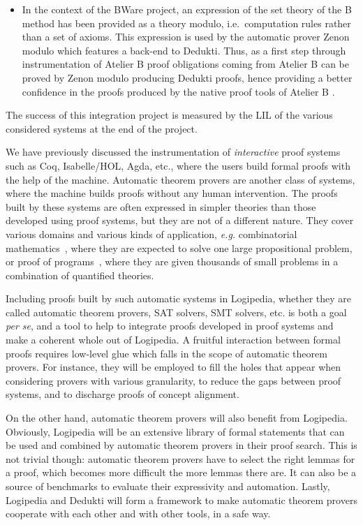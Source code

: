 \begin{itemize}
\item In the context of the BWare project, an expression of the set
  theory of the B method has been provided as a theory modulo, i.e.\ 
  computation rules rather than a set of axioms. This expression is used
  by the automatic prover Zenon modulo which features a back-end to
  Dedukti. Thus, as a first step through instrumentation of Atelier B
  proof obligations coming from Atelier B can be proved by Zenon
  modulo producing Dedukti proofs, hence providing a better confidence
  in the proofs produced by the native proof tools of Atelier B
  \cite{Bware}.
\end{itemize}

The success of this integration project is measured by the LIL of the various
considered systems at the end of the project.


We have previously discussed the instrumentation of \emph{interactive}
proof systems such as Coq, Isabelle/HOL, Agda, etc.,
where the users build formal proofs with the help of the
machine. Automatic theorem provers are another class of systems, where
the machine builds proofs without any human intervention. The proofs
built by these systems are often expressed in simpler theories than
those developed using proof systems, but they are not of a different
nature.  They cover various domains and various kinds of application,
{\em e.g.}  combinatorial
mathematics~\cite{DBLP:journals/ai/KonevL15,DBLP:conf/sat/HeuleKM16},
where they are expected to solve one large propositional problem, or
proof of
programs~\cite{DBLP:conf/esop/FilliatreP13,DBLP:journals/pacmpl/ProtzenkoZRRWBD17},
where they are given thousands of small problems in a combination of
quantified theories.

Including proofs built by such automatic systems in Logipedia,
whether they are called automatic theorem provers, SAT solvers, SMT
solvers, etc. is both a goal {\em per se}, and a tool to help to
integrate proofs developed in proof systems and make a coherent whole out
of Logipedia. A fruitful interaction between formal proofs requires
low-level glue which falls in the scope of automatic theorem provers.
For instance, they will be employed to fill the holes that appear when
considering provers with various granularity, to reduce the gaps
between proof systems, and to discharge proofs of concept alignment.

On the other hand, automatic theorem provers will also benefit from
Logipedia. Obviously, Logipedia will be an extensive library of formal
statements that can be used and combined by automatic theorem provers
in their proof search. This is not trivial though: automatic theorem
provers have to select the right lemmas for a proof, which becomes
more difficult the more lemmas there are. It can also be a source of benchmarks to
evaluate their expressivity and automation.  Lastly, Logipedia and
Dedukti will form a framework to make automatic theorem provers
cooperate with each other and with other tools, in a safe way.

